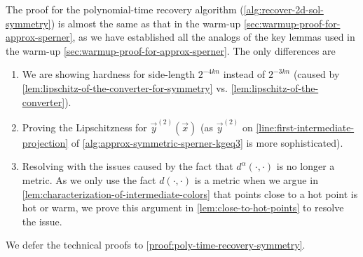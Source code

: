 The proof for the polynomial-time recovery algorithm (\cref{alg:recover-2d-sol-symmetry}) is almost the same as that in the warm-up \cref{sec:warmup-proof-for-approx-sperner},
as we have established all the analogs of the key lemmas used in the warm-up \cref{sec:warmup-proof-for-approx-sperner}. 
The only differences are 
\begin{enumerate}[itemsep=0em,topsep=0.5em]
    \item We are showing hardness for side-length $2^{-4kn}$ instead of $2^{-3kn}$ (caused by \cref{lem:lipschitz-of-the-converter-for-symmetry} vs. \cref{lem:lipschitz-of-the-converter}).
    \item Proving the Lipschitzness for $\vec{y}^{(2)}(\vec{x})$ (as $\vec{y}^{(2)}$ on \cref{line:first-intermediate-projection} of \cref{alg:approx-symmetric-sperner-kgeq3} is more sophisticated).
    \item Resolving with the issues caused by the fact that $d^{\alpha}(\cdot,\cdot)$ is no longer a metric. As we only use the fact $d(\cdot,\cdot)$ is a metric when we argue in \cref{lem:characterization-of-intermediate-colors} that points close to a hot point is hot or warm, we prove this argument in \cref{lem:close-to-hot-points} to resolve the issue.
\end{enumerate}
We defer the technical proofs to \cref{proof:poly-time-recovery-symmetry}.

\begin{algorithm2e}[t]
    \caption{Recover a $2${\rm D}-\Sperner solution from \outofk Approximate Symmetric \Sperner solutions}
    \label{alg:recover-2d-sol-symmetry}

    \DontPrintSemicolon



\end{algorithm2e}

